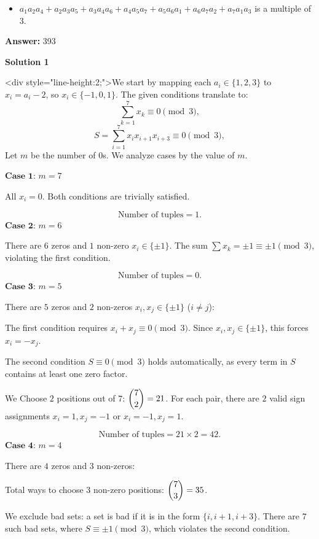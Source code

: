 \begin{enumerate}
\begin{itemize}
        \item $a_1a_2 a_4 + a_2a_3a_5 + a_3a_4 a_6 + a_4 a_5 a_7 + a_5 a_6 a_1 + a_6 a_7 a_2 + a_7 a_1 a_3$ is a multiple of $3.$
            \end{itemize}
            
 \textbf{Answer: }393



\textbf{Solution 1}

<div style="line-height:2;">We start by mapping each \(a_i \in \{1,2,3\}\) to \(x_i = a_i - 2\), so \(x_i \in \{-1, 0, 1\}\). The given conditions translate to:
 \[\sum_{k=1}^7 x_k \equiv 0 \pmod{3},\]
 \[S = \sum_{i=1}^7 x_i x_{i+1} x_{i+3} \equiv 0 \pmod{3},\]Let \(m\) be the number of \(0\)s. We analyze cases by the value of \(m\).

 $\textbf{Case 1}$: \(m = 7\)

 All \(x_i = 0\). Both conditions are trivially satisfied.

 
 \[\text{Number of tuples} = 1.\]
$\textbf{Case 2}$: \(m = 6\)

 There are \(6\) zeros and \(1\) non-zero \(x_i \in \{\pm 1\}\). The sum \(\sum x_k = \pm 1 \equiv \pm 1 \pmod{3}\), violating the first condition.

 
 \[\text{Number of tuples} = 0.\]
$\textbf{Case 3}$: \(m = 5\)

 There are \(5\) zeros and \(2\) non-zeros \(x_i, x_j \in \{\pm 1\}\) (\(i \neq j\)):

 The first condition requires \(x_i + x_j \equiv 0 \pmod{3}\). Since \(x_i, x_j \in \{\pm 1\}\), this forces \(x_i = -x_j\).

 The second condition \(S \equiv 0 \pmod{3}\) holds automatically, as every term in \(S\) contains at least one zero factor.

 We Choose \(2\) positions out of \(7\): \(\dbinom{7}{2} = 21\). For each pair, there are \(2\) valid sign assignments \(x_i=1, x_j=-1\) or \(x_i=-1, x_j=1\).

 
 \[\text{Number of tuples} = 21 \times 2 = 42.\]
$\textbf{Case 4}$: \(m = 4\)

 There are \(4\) zeros and \(3\) non-zeros:

 Total ways to choose \(3\) non-zero positions: \(\dbinom{7}{3} = 35\).

 We exclude bad sets: a set is bad if it is in the form \(\{i, i+1, i+3\}\). There are \(7\) such bad sets, where \(S \equiv \pm 1 \pmod{3}\), which violates the second condition.


\end{enumerate}
